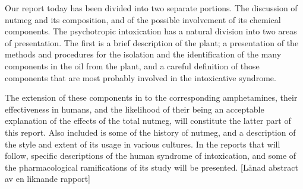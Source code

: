 Our report today has been divided into two separate portions. The discussion of nutmeg and its composition, and of the possible involvement of its chemical components. The psychotropic intoxication has a natural division into two areas of presentation. The first is a brief description of the plant; a presentation of the methods and procedures for the isolation and the identification of the many components in the oil from the plant, and a careful definition of those components that are most probably involved in the intoxicative syndrome.

The extension of these components in to the corresponding amphetamines, their effectiveness in humans, and the likelihood of their being an acceptable explanation of the effects of the total nutmeg, will constitute the latter part of this report. Also included is some of the history of nutmeg, and a description of the style and extent of its usage in various cultures. In the reports that will follow, specific descriptions of the human syndrome of intoxication, and some of the pharmacological ramifications of its study will be presented. [Lånad abstract av en liknande rapport]
